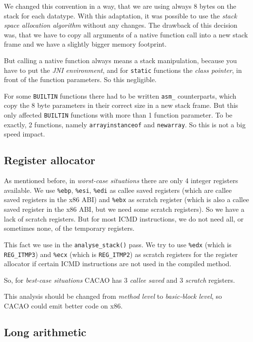 We changed this convention in a way, that we are using always 8 bytes
on the stack for each datatype. With this adaptation, it was possible
to use the \textit{stack space allocation algorithm} without any
changes. The drawback of this decision was, that we have to copy all
arguments of a native function call into a new stack frame and we have
a slightly bigger memory footprint.

But calling a native function always means a stack manipulation,
because you have to put the \textit{JNI environment}, and for
\texttt{static} functions the \textit{class pointer}, in front of the
function parameters. So this negligible.

For some \texttt{BUILTIN} functions there had to be written
\texttt{asm\_} counterparts, which copy the 8 byte parameters in their
correct size in a new stack frame. But this only affected
\texttt{BUILTIN} functions with more than 1 function parameter. To be
exactly, 2 functions, namely \texttt{arrayinstanceof} and
\texttt{newarray}. So this is not a big speed impact.


\subsection{Register allocator}

As mentioned before, in  \textit{worst-case situations} there are only
4 integer registers available. We use \texttt{\%ebp}, \texttt{\%esi},
\texttt{\%edi} as callee saved registers (which are callee saved
registers in the x86 ABI) and \texttt{\%ebx} as scratch register
(which is also a callee saved register in the x86 ABI, but we need
some scratch registers). So we have a lack of scratch registers. But
for most ICMD instructions, we do not need all, or sometimes none, of
the temporary registers.

This fact we use in the \texttt{analyse\_stack()} pass. We try to use
\texttt{\%edx} (which is \texttt{REG\_ITMP3}) and \texttt{\%ecx} (which
is \texttt{REG\_ITMP2}) as scratch registers for the register allocator
if certain ICMD instructions are not used in the compiled method.

So, for \textit{best-case situations} CACAO has 3 \textit{callee
saved} and 3 \textit{scratch} registers.

This analysis should be changed from \textit{method level} to
\textit{basic-block level}, so CACAO could emit better code on x86.


\subsection{Long arithmetic}

